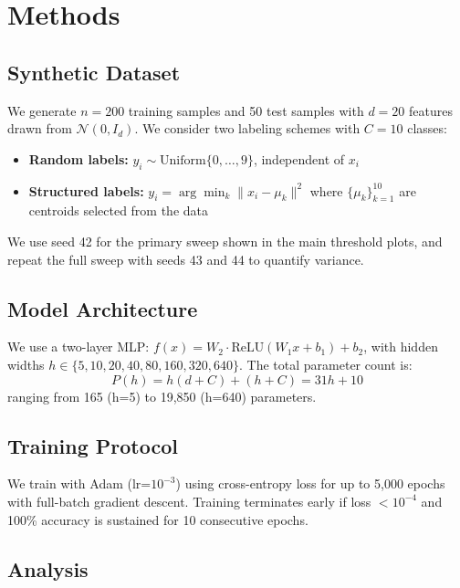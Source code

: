 \documentclass[11pt]{article}
\begin{document}
\section{Methods}

\subsection{Synthetic Dataset}

We generate $n = 200$ training samples and 50 test samples with $d = 20$ features drawn from $\mathcal{N}(0, I_d)$. We consider two labeling schemes with $C = 10$ classes:

\begin{itemize}
    \item \textbf{Random labels:} $y_i \sim \text{Uniform}\{0, \ldots, 9\}$, independent of $x_i$
    \item \textbf{Structured labels:} $y_i = \arg\min_k \|x_i - \mu_k\|^2$ where $\{\mu_k\}_{k=1}^{10}$ are centroids selected from the data
\end{itemize}

We use seed 42 for the primary sweep shown in the main threshold plots, and repeat the full sweep with seeds 43 and 44 to quantify variance.

\subsection{Model Architecture}

We use a two-layer MLP: $f(x) = W_2 \cdot \text{ReLU}(W_1 x + b_1) + b_2$, with hidden widths $h \in \{5, 10, 20, 40, 80, 160, 320, 640\}$. The total parameter count is:
\begin{equation}
    P(h) = h(d + C) + (h + C) = 31h + 10
\end{equation}
ranging from 165 (h=5) to 19,850 (h=640) parameters.

\subsection{Training Protocol}

We train with Adam (lr=$10^{-3}$) using cross-entropy loss for up to 5,000 epochs with full-batch gradient descent. Training terminates early if loss $< 10^{-4}$ and 100\% accuracy is sustained for 10 consecutive epochs.

\subsection{Analysis}
\end{document}
